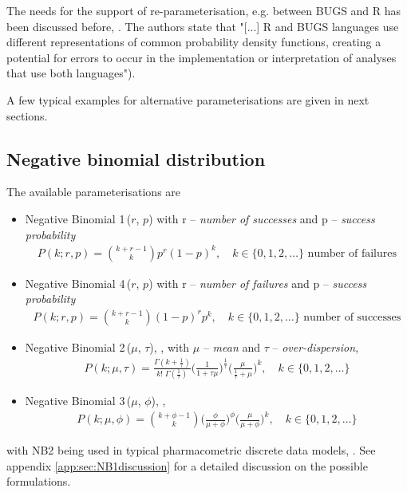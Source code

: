 {The needs for the support of re-parameterisation, e.g. between BUGS and R has been 
discussed before, \cite{lebauer2013translating}. The authors state that "[...] R and BUGS 
languages use different representations of common probability density 
functions, creating a potential for errors to occur in the implementation 
or interpretation of analyses that use both languages"). 

A few typical examples for alternative parameterisations are given in next sections.

\subsection{Negative binomial distribution} 
\label{subsec:altNB}
The available parameterisations are
\begin{itemize}
\item
Negative Binomial 1\,($r$, $p$) with r -- \emph{number of successes} and p -- \emph{success probability}
\begin{align}
P(k;r,p) = \binom {k+r-1}k p^r (1-p)^k, \quad k\in \{0,1,2,\dots \} \text{ number of failures} \nonumber
\end{align}

\item
Negative Binomial 4\,($r$, $p$) with r -- \emph{number of failures} and p -- \emph{success probability}
\begin{align}
P(k;r,p) = \binom {k+r-1}k (1-p)^r p^k, \quad k\in \{0,1,2,\dots \} \text{ number of successes} \nonumber
\end{align}

\item
Negative Binomial 2\,($\mu$, $\tau$), \cite{Plan:2009fk}, with $\mu$ -- \emph{mean} and $\tau$ -- \emph{over-dispersion},
\begin{align}
P(k;\mu,\tau) = \frac{\Gamma(k+\frac{1}{\tau})}{k!\; \Gamma(\frac{1}{\tau})} \Big(\frac{1}{1+\tau \mu} \Big)^{\frac{1}{\tau}} \Big(\frac{\mu}{\frac{1}{\tau} + \mu} \Big)^{k},\quad k\in \{0,1,2,\dots \}  \nonumber
\end{align}

\item
Negative Binomial 3\,($\mu$, $\phi$), \cite{stan-manual:2015}, %
\begin{align}
P(k;\mu,\phi) = \binom {k+\phi-1}k \Big(\frac{\phi}{\mu + \phi} \Big)^{\phi} \Big(\frac{\mu}{\mu + \phi} \Big)^{k},\quad k\in \{0,1,2,\dots \}  \nonumber
\end{align}
\end{itemize}
with NB2 being used in typical pharmacometric discrete data models, \cite{Plan:2009fk, Troconiz:2009fv}.
See appendix \ref{app:sec:NB1discussion} for a detailed discussion on the possible formulations. 

}
